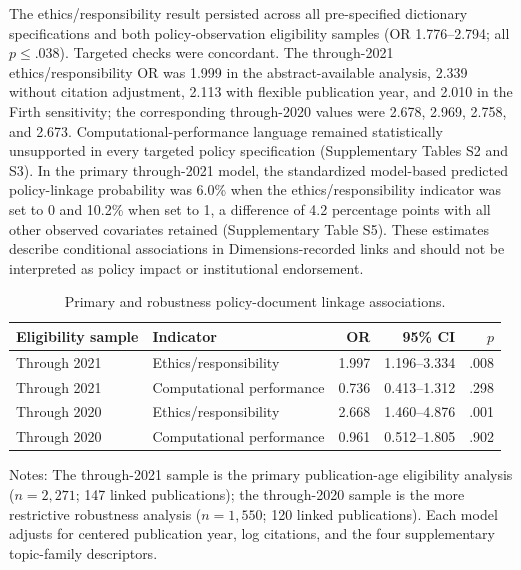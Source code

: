 \documentclass[12pt]{article}
\begin{document}
The ethics/responsibility result persisted across all pre-specified dictionary specifications and both policy-observation eligibility samples (OR 1.776--2.794; all $p\leq .038$). Targeted checks were concordant. The through-2021 ethics/responsibility OR was 1.999 in the abstract-available analysis, 2.339 without citation adjustment, 2.113 with flexible publication year, and 2.010 in the Firth sensitivity; the corresponding through-2020 values were 2.678, 2.969, 2.758, and 2.673. Computational-performance language remained statistically unsupported in every targeted policy specification (Supplementary Tables S2 and S3). In the primary through-2021 model, the standardized model-based predicted policy-linkage probability was 6.0\% when the ethics/responsibility indicator was set to 0 and 10.2\% when set to 1, a difference of 4.2 percentage points with all other observed covariates retained (Supplementary Table S5). These estimates describe conditional associations in Dimensions-recorded links and should not be interpreted as policy impact or institutional endorsement.

\begin{table}[H]
\centering
\caption{Primary and robustness policy-document linkage associations.}
\label{tab:policy-eligibility}
\begin{tabular}{llrrr}
\toprule
Eligibility sample & Indicator & OR & 95\% CI & $p$ \\
\midrule
Through 2021 & Ethics/responsibility & 1.997 & 1.196--3.334 & .008 \\
Through 2021 & Computational performance & 0.736 & 0.413--1.312 & .298 \\
Through 2020 & Ethics/responsibility & 2.668 & 1.460--4.876 & .001 \\
Through 2020 & Computational performance & 0.961 & 0.512--1.805 & .902 \\
\bottomrule
\end{tabular}
\begin{flushleft}
\footnotesize Notes: The through-2021 sample is the primary publication-age eligibility analysis ($n=2,271$; 147 linked publications); the through-2020 sample is the more restrictive robustness analysis ($n=1,550$; 120 linked publications). Each model adjusts for centered publication year, log citations, and the four supplementary topic-family descriptors.
\end{flushleft}
\end{table}
\end{document}
